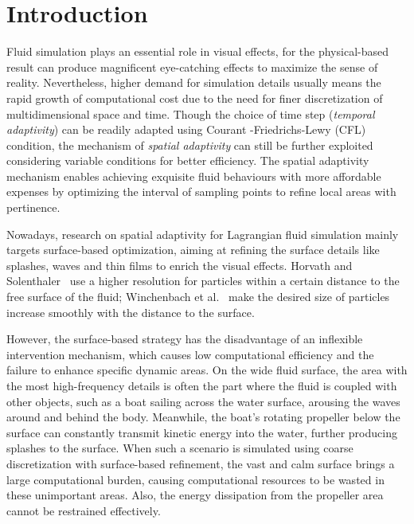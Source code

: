 \documentclass[VANCOUVER,STIX1COL]{WileyNJD-v2}
\providecommand{\DIFadd}[1]{{\protect\color{blue}\uwave{#1}}} %
\providecommand{\DIFaddbegin}{} %
\providecommand{\DIFaddend}{} %
\begin{document}
\section{Introduction}
Fluid simulation plays an essential role in visual effects, for the physical-based result can produce magnificent eye-catching effects to maximize the sense of reality. Nevertheless, higher demand for simulation details usually means the rapid growth of computational cost due to the need for \DIFaddbegin \DIFadd{the }\DIFaddend finer discretization of multidimensional space and time. Though the choice of time step (\emph{temporal adaptivity}) can be readily adapted using Courant
-Friedrichs-Lewy (CFL) condition, the mechanism of \emph{spatial adaptivity} can still be further exploited considering variable conditions for better efficiency. The spatial adaptivity mechanism enables achieving exquisite fluid behaviours with more affordable expenses by optimizing the interval of sampling points to refine local areas with pertinence.

Nowadays, research on spatial adaptivity for Lagrangian fluid simulation mainly targets surface-based optimization, aiming at refining the surface details like splashes, waves and thin films to enrich the visual effects. Horvath and Solenthaler~\cite{Horvath13} use a higher resolution for particles within a certain distance to the free surface of the fluid; Winchenbach et al.~\cite{Winchenbach17} make the desired size of particles increase smoothly with the distance to the surface.

However, the surface-based strategy has the disadvantage of an inflexible intervention mechanism, which causes low computational efficiency and the failure to enhance specific dynamic areas. On the wide fluid surface, the area with the most high-frequency details is often the part where the fluid is coupled with other objects, such as a boat sailing across the water surface, arousing the waves around and behind the body. Meanwhile, the boat's rotating propeller below the surface can constantly transmit kinetic energy into the water, further producing splashes to the surface. When such a scenario is simulated using coarse discretization with surface-based refinement, the vast and calm surface brings a large computational burden, causing computational resources to be wasted in these unimportant areas. Also, the energy dissipation from the propeller area cannot be restrained effectively. 
\end{document}
